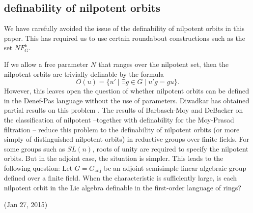\documentclass[12pt]{amsart}
\newcommand{\op}[1]{\operatorname{#1}}
\theoremstyle{plain}
\theoremstyle{definition}
\begin{document}
\subsection{definability of nilpotent orbits}

We have carefully avoided the issue of the definability of nilpotent
orbits in this paper.  This has required us to use certain roundabout
constructions such as the set $NF^k_G$.

If we allow a free parameter $N$ that ranges over the nilpotent set,
then the nilpotent orbits are trivially definable by the formula
\[
O(u) = \{u' \mid \exists g\in G\mid u' g = g
u \}.
\]  
However, this leaves open the question of whether nilpotent orbits can
be defined in the Denef-Pas language without the use of parameters.
Diwadkar has obtained partial results on this problem \cite{Did}.  The
results of Barbasch-Moy and DeBacker on the classification of
nilpotent --together with definability for the Moy-Prasad filtration
\cite{cgh} -- reduce this problem to the definability of nilpotent
orbits (or more simply of distinguished nilpotent orbits) in reductive
groups over finite fields.  For some groups such as $SL(n)$, roots of
unity are required to specify the nilpotent orbits.  But in the
adjoint case, the situation is simpler. This leads to the following
question: Let $G=G_{\op{adj}}$ be an adjoint semisimple linear algebraic
group defined over a finite field.  When the characteristic is
sufficiently large, is each nilpotent orbit in the Lie algebra
definable in the first-order language of rings?




(Jan 27, 2015)
\end{document}

